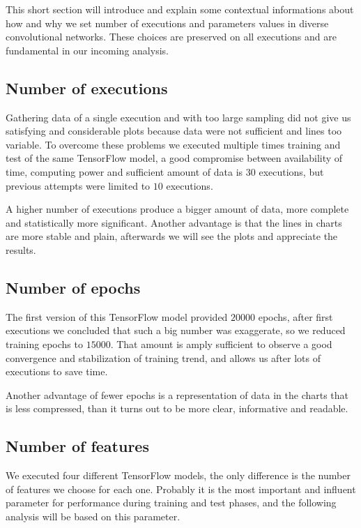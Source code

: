 This short section will introduce and explain some contextual informations about how and why we set number of executions and parameters values in diverse convolutional networks. These choices are preserved on all executions and are fundamental in our incoming analysis.

\subsection{Number of executions}

Gathering data of a single execution and with too large sampling did not give us satisfying and considerable plots because data were not sufficient and lines too variable. To overcome these problems we executed multiple times training and test of the same TensorFlow model, a good compromise between availability of time, computing power and sufficient amount of data is $30$ executions, but previous attempts were limited to $10$ executions.

A higher number of executions produce a bigger amount of data, more complete and statistically more significant. Another advantage is that the lines in charts are more stable and plain, afterwards we will see the plots and appreciate the results.

\subsection{Number of epochs}

The first version of this TensorFlow model provided $20000$ epochs, after first executions we concluded that such a big number was exaggerate, so we reduced training epochs to $15000$. That amount is amply sufficient to observe a good convergence and stabilization of training trend, and allows us after lots of executions to save time.

Another advantage of fewer epochs is a representation of data in the charts that is less compressed, than it turns out to be more clear, informative and readable.

\subsection{Number of features}

We executed four different TensorFlow models, the only difference is the number of features we choose for each one. Probably it is the most important and influent parameter for performance during training and test phases, and the following analysis will be based on this parameter.

